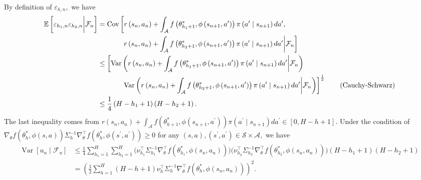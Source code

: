 \documentclass{article}
\numberwithin{equation}{section}
\theoremstyle{plain}
\theoremstyle{definition}
\theoremstyle{remark}
\begin{document}
By definition of $\varepsilon_{h,n},$ we have
\begin{align*}
    \mathbb{E}\left[\varepsilon_{h_1, n} \varepsilon_{h_2, n} \bigg| \mathcal{F}_n\right]
    &= \operatorname{Cov}\left[r\left(s_n, a_n\right) + \int_{\mathcal{A}} f\left(\theta_{h_1+1}^*, \phi\left(s_{n+1}, a^{\prime}\right)\right) \pi\left(a^{\prime} \mid s_{n+1}\right) d a^{\prime},\right.\\
    &\hspace{8ex} \left.r\left(s_n, a_n\right) + \int_{\mathcal{A}} f\left(\theta_{h_2+1}^*, \phi\left(s_{n+1}, a^{\prime}\right)\right) \pi\left(a^{\prime} \mid s_{n+1}\right) d a^{\prime} \bigg| \mathcal{F}_n\right] \\
    & \leq \left[\operatorname{Var}\left(r\left(s_n, a_n\right) + \int_{\mathcal{A}} f\left(\theta_{h_1+1}^*, \phi\left(s_{n+1}, a^{\prime}\right)\right) \pi\left(a^{\prime} \mid s_{n+1}\right) d a^{\prime}\bigg| \mathcal{F}_n\right)\right.\\
    & \hspace{8ex} \left.\operatorname{Var}\left(r\left(s_n, a_n\right) + \int_{\mathcal{A}} f\left(\theta_{h_2+1}^*, \phi\left(s_{n+1}, a^{\prime}\right)\right) \pi\left(a^{\prime} \mid s_{n+1}\right) d a^{\prime}\bigg| \mathcal{F}_n\right)\right]^{\frac{1}{2}} \tag{Cauchy-Schwarz}\\
    &\leq \frac{1}{4} \left(H-h_1+1\right) \left(H-h_2+1\right).
\end{align*}
The last inequality comes from $r\left(s_n, a_n\right) + \int_{\mathcal{A}} f\left(\theta_{h+1}^*, \phi\left(s_{n+1}, a^{\prime}\right)\right) \pi\left(a^{\prime} \mid s_{n+1}\right) d a^{\prime} \in [0,H-h+1].$ Under the condition of $\nabla_{\theta} f(\theta_h^*,\phi(s,a)) \Sigma_h^{-1} \nabla_{\theta}^{\top} f(\theta_h^*,\phi(s^{\prime},a^{\prime})) \geq 0$ for any $(s,a),(s^{\prime},a^{\prime}) \in \mathcal{S} \times \mathcal{A},$ we have
\begin{align*}
    \operatorname{Var}\left[u_n\mid \mathcal{F}_n\right]
    & \leq \frac{1}{4} \sum_{h_1=1}^H \sum_{h_2=1}^H \bigg(\nu_{h_1}^{\top} \Sigma_{h_1}^{-1}\nabla_{\theta}^{\top} f\left(\theta_{h_1}^*, \phi\left(s_n, a_n\right)\right)\bigg) \bigg(\nu_{h_2}^{\top} \Sigma_{h_2}^{-1}\nabla_{\theta}^{\top} f\left(\theta_{h_2}^*, \phi\left(s_n, a_n\right)\right)\bigg) (H - h_1 + 1)(H - h_2 + 1) \\
    & = \left(\frac{1}{2} \sum_{h=1}^H (H-h+1)\nu_{h}^{\top} \Sigma_{h}^{-1}\nabla_{\theta}^{\top} f\left(\theta_{h}^*, \phi\left(s_n, a_n\right)\right)\right)^2.
\end{align*}
\end{document}
